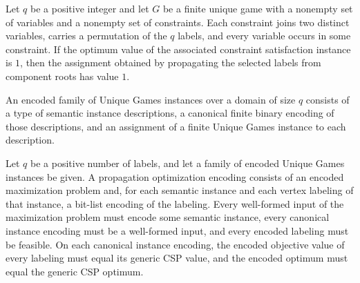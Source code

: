 \begin{theorem}
\label{FABL.FiniteUniqueGame.propagationAssignment_one_one}
\leanok
{}
Let $q$ be a positive integer and let $G$ be a finite unique game with a nonempty set of
variables and a nonempty set of constraints. Each constraint joins two distinct
variables, carries a permutation of the $q$ labels, and every variable occurs in some
constraint. If the optimum value of the associated constraint satisfaction instance is
$1$, then the assignment obtained by propagating the selected labels from component
roots has value $1$.
\end{theorem}

\begin{definition}
\label{FABL.EncodedUniqueGamesFamily}
\leanok
{}
An encoded family of Unique Games instances over a domain of size $q$ consists of a type
of semantic instance descriptions, a canonical finite binary encoding of those
descriptions, and an assignment of a finite Unique Games instance to each description.
\end{definition}

\begin{definition}
\label{FABL.EncodedUniqueGamesFamily.PropagationOptimizationEncoding}
\leanok
{}
Let $q$ be a positive number of labels, and let a family of encoded Unique Games
instances be given. A propagation optimization encoding consists of an encoded
maximization problem and, for each semantic instance and each vertex labeling of that
instance, a bit-list encoding of the labeling. Every well-formed input of the
maximization problem must encode some semantic instance, every canonical instance
encoding must be a well-formed input, and every encoded labeling must be feasible. On
each canonical instance encoding, the encoded objective value of every labeling must
equal its generic CSP value, and the encoded optimum must equal the generic CSP optimum.
\end{definition}

